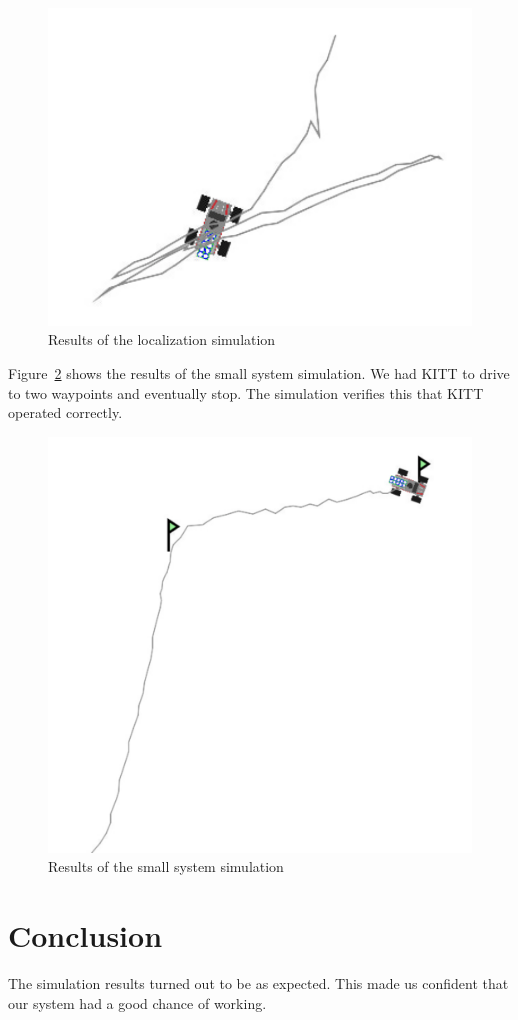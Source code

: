 \documentclass[11pt,titlepage]{report}
\begin{document}
\begin{figure}[H]
	\begin{center}
		\includegraphics[width=0.4\linewidth]{resource/localization-simulation.pdf}
	\end{center}
	\caption{Results of the localization simulation}
	\label{fig:sim-loc-res}
\end{figure}

Figure~\ref{fig:sim-sys-res} shows the results of the small system simulation. We had KITT to drive to two waypoints and eventually stop. The simulation verifies this that KITT operated correctly.

\begin{figure}[H]
	\begin{center}
		\includegraphics[width=0.7\linewidth]{resource/system-simulation.pdf}
	\end{center}
	\caption{Results of the small system simulation}
	\label{fig:sim-sys-res}
\end{figure}

\section{Conclusion}
The simulation results turned out to be as expected. This made us confident that our system had a good chance of working.
\end{document}
